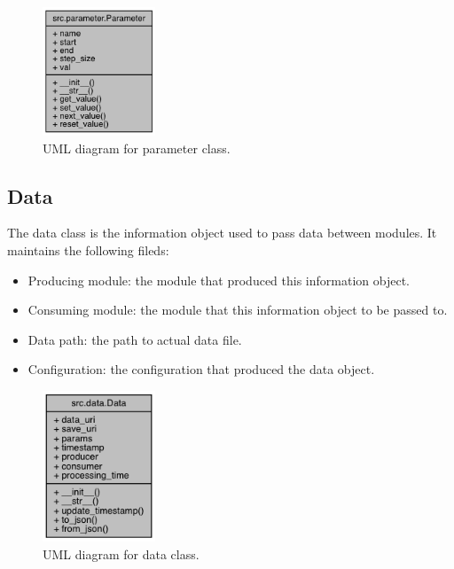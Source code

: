 \documentclass{article}
\begin{document}
    \begin{figure}[H]
        \begin{center}
            \includegraphics[width=0.3\textwidth]{fig/param_uml.png}
        \end{center}
        \label{fig:param_uml}
        \caption{UML diagram for parameter class.}
    \end{figure}

    \subsection{Data}
    \label{sec:infomation_object}
    The data class is the information object used to pass data between modules.
    It maintains the following fileds:
    \begin{itemize}
        \item Producing module: the module that produced this information object.
        \item Consuming module: the module that this information object to be passed to.
        \item Data path: the path to actual data file.
        \item Configuration: the configuration that produced the data object.
    \end{itemize}


    \begin{figure}[H]
        \begin{center}
            \includegraphics[width=0.3\textwidth]{fig/data_uml.png}
        \end{center}
        \label{fig:data_uml}
        \caption{UML diagram for data class.}
    \end{figure}
\end{document}
